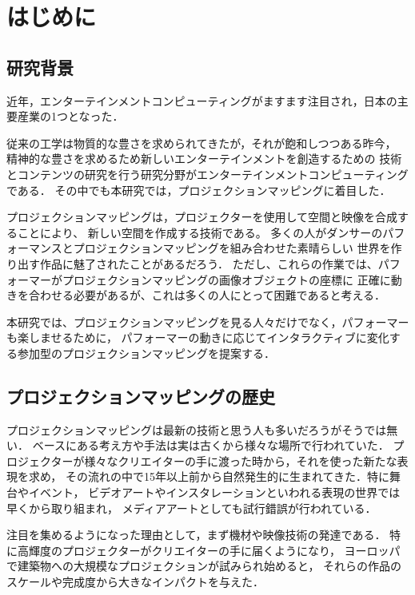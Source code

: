 \chapter{はじめに}
\thispagestyle{fancy}
\setcounter{page}{1}
\renewcommand{\thepage}{\arabic{page}}

\section{研究背景}
近年，エンターテインメントコンピューティングがますます注目され，日本の主要産業の1つとなった．

従来の工学は物質的な豊さを求められてきたが，それが飽和しつつある昨今，
精神的な豊さを求めるため新しいエンターテインメントを創造するための
技術とコンテンツの研究を行う研究分野がエンターテインメントコンピューティングである．
その中でも本研究では，プロジェクションマッピングに着目した．

プロジェクションマッピングは，プロジェクターを使用して空間と映像を合成することにより、
新しい空間を作成する技術である。
多くの人がダンサーのパフォーマンスとプロジェクションマッピングを組み合わせた素晴らしい
世界を作り出す作品に魅了されたことがあるだろう．
ただし、これらの作業では、パフォーマーがプロジェクションマッピングの画像オブジェクトの座標に
正確に動きを合わせる必要があるが、これは多くの人にとって困難であると考える．

本研究では、プロジェクションマッピングを見る人々だけでなく，パフォーマーも楽しませるために，
パフォーマーの動きに応じてインタラクティブに変化する参加型のプロジェクションマッピングを提案する．

\clearpage

\section{プロジェクションマッピングの歴史}
プロジェクションマッピングは最新の技術と思う人も多いだろうがそうでは無い．
ベースにある考え方や手法は実は古くから様々な場所で行われていた．
プロジェクターが様々なクリエイターの手に渡った時から，それを使った新たな表現を求め，
その流れの中で15年以上前から自然発生的に生まれてきた．特に舞台やイベント，
ビデオアートやインスタレーションといわれる表現の世界では早くから取り組まれ，
メディアアートとしても試行錯誤が行われている．

注目を集めるようになった理由として，まず機材や映像技術の発達である．
特に高輝度のプロジェクターがクリエイターの手に届くようになり，
ヨーロッパで建築物への大規模なプロジェクションが試みられ始めると，
それらの作品のスケールや完成度から大きなインパクトを与えた．

